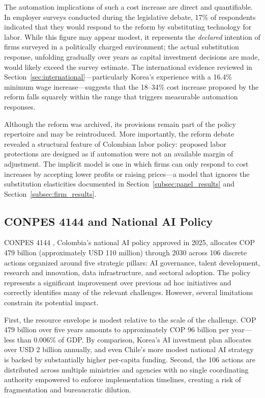 The automation implications of such a cost increase are direct and quantifiable. In employer surveys conducted during the legislative debate, 17\% of respondents indicated that they would respond to the reform by substituting technology for labor. While this figure may appear modest, it represents the \textit{declared} intention of firms surveyed in a politically charged environment; the actual substitution response, unfolding gradually over years as capital investment decisions are made, would likely exceed the survey estimate. The international evidence reviewed in Section~\ref{sec:international}---particularly Korea's experience with a 16.4\% minimum wage increase---suggests that the 18--34\% cost increase proposed by the reform falls squarely within the range that triggers measurable automation responses.

Although the reform was archived, its provisions remain part of the policy repertoire and may be reintroduced. More importantly, the reform debate revealed a structural feature of Colombian labor policy: proposed labor protections are designed as if automation were not an available margin of adjustment. The implicit model is one in which firms can only respond to cost increases by accepting lower profits or raising prices---a model that ignores the substitution elasticities documented in Section~\ref{subsec:panel_results} and Section~\ref{subsec:firm_results}.

\subsection{CONPES 4144 and National AI Policy}
\label{subsec:conpes}

CONPES 4144 \cite{conpes4144}, Colombia's national AI policy approved in 2025, allocates COP 479 billion (approximately USD 110 million) through 2030 across 106 discrete actions organized around five strategic pillars: AI governance, talent development, research and innovation, data infrastructure, and sectoral adoption. The policy represents a significant improvement over previous ad hoc initiatives and correctly identifies many of the relevant challenges. However, several limitations constrain its potential impact.

First, the resource envelope is modest relative to the scale of the challenge. COP 479 billion over five years amounts to approximately COP 96 billion per year---less than 0.006\% of GDP. By comparison, Korea's AI investment plan allocates over USD 2 billion annually, and even Chile's more modest national AI strategy is backed by substantially higher per-capita funding. Second, the 106 actions are distributed across multiple ministries and agencies with no single coordinating authority empowered to enforce implementation timelines, creating a risk of fragmentation and bureaucratic dilution.

